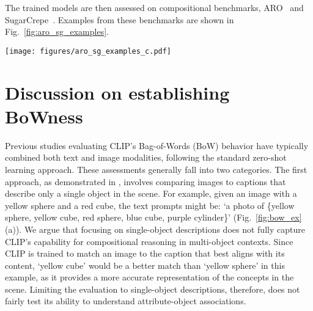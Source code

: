 The trained models are then assessed on compositional benchmarks, ARO~\cite{Yuksekgonul2023} and SugarCrepe~\cite{hsieh2024sugarcrepe}. Examples from these benchmarks are shown in Fig.~\ref{fig:aro_sg_examples}.
\begin{figure*}[]
  \centering
   \texttt{[image: figures/aro\_sg\_examples\_c.pdf]}
   \caption{\textbf{Examples from the compositional benchmarks ARO and SugarCrepe.} These datasets are designed to test VLMs' ability to accurately bind attributes and objects in complex, real-world scenarios. The images illustrate varied compositions of objects, attributes, and their relationships, challenging a model's compositional understanding.}
   \label{fig:aro_sg_examples}
\end{figure*}

\section{Discussion on establishing BoWness}

Previous studies evaluating CLIP's Bag-of-Words (BoW) behavior have typically combined both text and image modalities, following the standard zero-shot learning approach. These assessments generally fall into two categories. The first approach, as demonstrated in \cite{Lewis2024, Tang2023}, involves comparing images to captions that describe only a single object in the scene. For example, given an image with a yellow sphere and a red cube, the text prompts might be: `a photo of \{yellow sphere, yellow cube, red sphere, blue cube, purple cylinder\}' (Fig.~\ref{fig:bow_ex}(a)). We argue that focusing on single-object descriptions does not fully capture CLIP’s capability for compositional reasoning in multi-object contexts. Since CLIP is trained to match an image to the caption that best aligns with its content, `yellow cube' would be a better match than `yellow sphere' in this example, as it provides a more accurate representation of the concepts in the scene. Limiting the evaluation to single-object descriptions, therefore, does not fairly test its ability to understand attribute-object associations.

